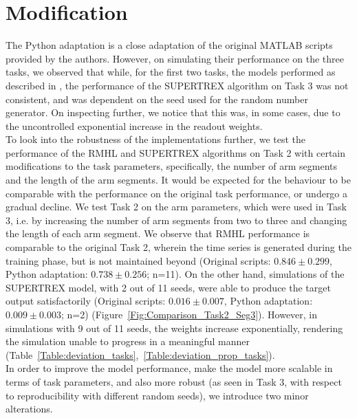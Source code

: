\section{Modification}

The Python adaptation is a close adaptation of the original MATLAB scripts provided by the authors. However, on simulating their performance on the three tasks, we observed that while, for the first two tasks, the models performed as described in \textcite{pyle2019}, the performance of the SUPERTREX algorithm on Task 3 was not consistent, and was dependent on the seed used for the random number generator. On inspecting further, we notice that this was, in some cases, due to the uncontrolled exponential increase in the readout weights.\\

To look into the robustness of the implementations further, we test the performance of the RMHL and SUPERTREX algorithms on Task 2 with certain modifications to the task parameters, specifically, the number of arm segments and the length of the arm segments. It would be expected for the behaviour to be comparable with the performance on the original task performance, or undergo a gradual decline. We test Task 2 on the arm parameters, which were used in Task 3, i.e. by increasing the number of arm segments from two to three and changing the length of each arm segment. We observe that RMHL performance is comparable to the original Task 2, wherein the time series is generated during the training phase, but is not maintained beyond (Original scripts: $0.846\pm0.299$, Python adaptation: $0.738\pm0.256$; n=11).  On the other hand, simulations of the SUPERTREX model, with 2 out of 11 seeds, were able to produce the target output satisfactorily (Original scripts: $0.016\pm0.007$, Python adaptation: $0.009\pm0.003$; n=2) (Figure~\ref{Fig:Comparison_Task2_Seg3}). However, in simulations with 9 out of 11 seeds, the weights increase exponentially, rendering the simulation unable to progress in a meaningful manner (Table~\ref{Table:deviation_tasks},~\ref{Table:deviation_prop_tasks}). \\
    



In order to improve the model performance, make the model more scalable in terms of task parameters, and also more robust (as seen in Task 3, with respect to reproducibility with different random seeds), we introduce two minor alterations.

